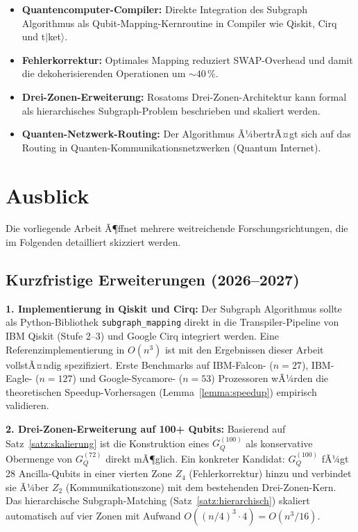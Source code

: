 ﻿\documentclass[a4paper,12pt]{article}
\theoremstyle{definition}
\begin{document}
\begin{itemize}
\item \textbf{Quantencomputer-Compiler:} Direkte Integration des Subgraph Algorithmus
  als Qubit-Mapping-Kernroutine in Compiler wie Qiskit, Cirq und t$|$ket$\rangle$.
\item \textbf{Fehlerkorrektur:} Optimales Mapping reduziert SWAP-Overhead und damit
  die dekoherisierenden Operationen um $\sim 40\,\%$.
\item \textbf{Drei-Zonen-Erweiterung:} Rosatoms Drei-Zonen-Architektur kann formal
  als hierarchisches Subgraph-Problem beschrieben und skaliert werden.
\item \textbf{Quanten-Netzwerk-Routing:} Der Algorithmus Ã¼bertrÃ¤gt sich auf das
  Routing in Quanten-Kommunikationsnetzwerken (Quantum Internet).
\end{itemize}

\section{Ausblick}
\label{sec:ausblick}

Die vorliegende Arbeit Ã¶ffnet mehrere weitreichende Forschungsrichtungen, die im
Folgenden detailliert skizziert werden.

\subsection{Kurzfristige Erweiterungen (2026--2027)}

\textbf{1. Implementierung in Qiskit und Cirq:}
Der Subgraph Algorithmus sollte als Python-Bibliothek \texttt{subgraph\_mapping}
direkt in die Transpiler-Pipeline von IBM Qiskit (Stufe 2--3) und Google Cirq
integriert werden. Eine Referenzimplementierung in $O(n^3)$ ist mit den
Ergebnissen dieser Arbeit vollstÃ¤ndig spezifiziert. Erste Benchmarks auf
IBM-Falcon- ($n = 27$), IBM-Eagle- ($n = 127$) und Google-Sycamore- ($n = 53$)
Prozessoren wÃ¼rden die theoretischen Speedup-Vorhersagen (Lemma~\ref{lemma:speedup})
empirisch validieren.

\textbf{2. Drei-Zonen-Erweiterung auf 100+ Qubits:}
Basierend auf Satz~\ref{satz:skalierung} ist die Konstruktion eines
$G_Q^{(100)}$ als konservative Obermenge von $G_Q^{(72)}$ direkt mÃ¶glich. Ein
konkreter Kandidat: $G_Q^{(100)}$ fÃ¼gt 28 Ancilla-Qubits in einer vierten Zone
$Z_4$ (Fehlerkorrektur) hinzu und verbindet sie Ã¼ber $Z_2$ (Kommunikationszone)
mit dem bestehenden Drei-Zonen-Kern. Das hierarchische Subgraph-Matching
(Satz~\ref{satz:hierarchisch}) skaliert automatisch auf vier Zonen mit Aufwand
$O((n/4)^3 \cdot 4) = O(n^3/16)$.
\end{document}
